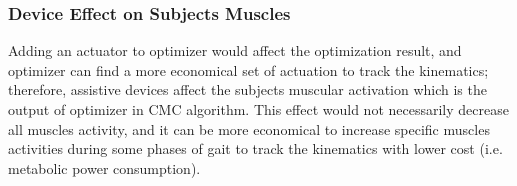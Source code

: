 \documentclass[10pt,letterpaper]{article}
\begin{document}
\subsubsection*{Device Effect on Subjects Muscles}
Adding an actuator to optimizer would affect the optimization result, and optimizer can find a more economical set of actuation to track the kinematics; therefore, assistive devices affect the subjects muscular activation which is the output of optimizer in CMC algorithm. This effect would not necessarily decrease all muscles activity, and it can be more economical to increase specific muscles activities during some phases of gait to track the kinematics with lower cost (i.e. metabolic power consumption).\\
\begin{figure}[!h]
	\centering
	\hfil
	\hfil
	\hfil
\end{figure}
\end{document}

